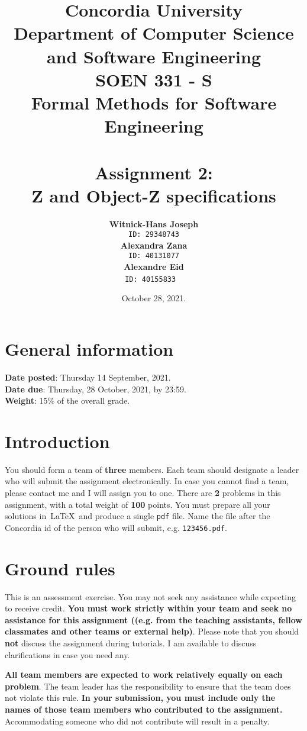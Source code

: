 \documentclass[12pt]{article}
\title{Concordia University\\
Department of Computer Science and Software Engineering\\
\textbf{SOEN 331 - S\\Formal Methods for Software Engineering}\\
\ \\
\textbf{Assignment 2: \\Z and Object-Z specifications}}
\author{\textbf{Witnick-Hans Joseph}\\
		\texttt{ID: 29348743}\\
		\textbf{Alexandra Zana}\\
		\texttt{ID: 40131077}\\
		\textbf{Alexandre Eid}\\
		\texttt{ID: 40155833}
\ \\}
\date{October 28, 2021.}
\begin{document}
\maketitle

\newpage
\tableofcontents
\newpage

\section{General information}

\noindent \textbf{Date posted}: Thursday 14 September, 2021.\\
\noindent \textbf{Date due}: Thursday, 28 October, 2021, by 23:59.\\
\noindent \textbf{Weight}: 15\% of the overall grade.

\section{Introduction}
You should form a team of \textbf{three} members. Each team should designate a leader who will submit the assignment electronically. In case you cannot find a team, please contact me and I will assign you to one. There are \textbf{2} problems in this assignment, with a total weight of \textbf{100} points. You must prepare all your solutions in~\LaTeX~and produce a single \texttt{pdf} file. Name the file after the Concordia id of the person who will submit, e.g. \texttt{123456.pdf}.

\section{Ground rules}

This is an assessment exercise.  You may not seek any assistance while expecting to receive credit. \textbf{You must work strictly within your team and seek no assistance for this assignment ((e.g. from the teaching assistants, fellow classmates and other teams or external help)}. Please note that you should \textbf{not} discuss the assignment during tutorials. I am available to discuss clarifications in case you need any.

\noindent \textbf{All team members are expected to work relatively equally on each problem}. The team leader has the responsibility to ensure that the team does not violate this rule. \textbf{In your submission, you must include only the names of those team members who contributed to the assignment.} Accommodating someone who did not contribute will result in a penalty.
\end{document}
